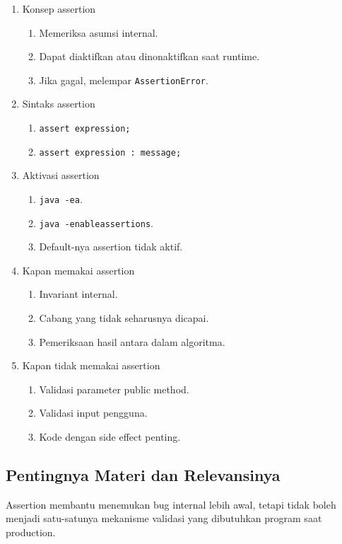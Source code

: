 \begin{enumerate}
    \item Konsep assertion
    \begin{enumerate}
        \item Memeriksa asumsi internal.
        \item Dapat diaktifkan atau dinonaktifkan saat runtime.
        \item Jika gagal, melempar \texttt{AssertionError}.
    \end{enumerate}
    \item Sintaks assertion
    \begin{enumerate}
        \item \texttt{assert expression;}
        \item \texttt{assert expression : message;}
    \end{enumerate}
    \item Aktivasi assertion
    \begin{enumerate}
        \item \texttt{java -ea}.
        \item \texttt{java -enableassertions}.
        \item Default-nya assertion tidak aktif.
    \end{enumerate}
    \item Kapan memakai assertion
    \begin{enumerate}
        \item Invariant internal.
        \item Cabang yang tidak seharusnya dicapai.
        \item Pemeriksaan hasil antara dalam algoritma.
    \end{enumerate}
    \item Kapan tidak memakai assertion
    \begin{enumerate}
        \item Validasi parameter public method.
        \item Validasi input pengguna.
        \item Kode dengan side effect penting.
    \end{enumerate}
\end{enumerate}

\subsection{Pentingnya Materi dan Relevansinya}

\begin{jawab}
Assertion membantu menemukan bug internal lebih awal, tetapi tidak boleh menjadi satu-satunya mekanisme validasi yang dibutuhkan program saat production.
\end{jawab}

